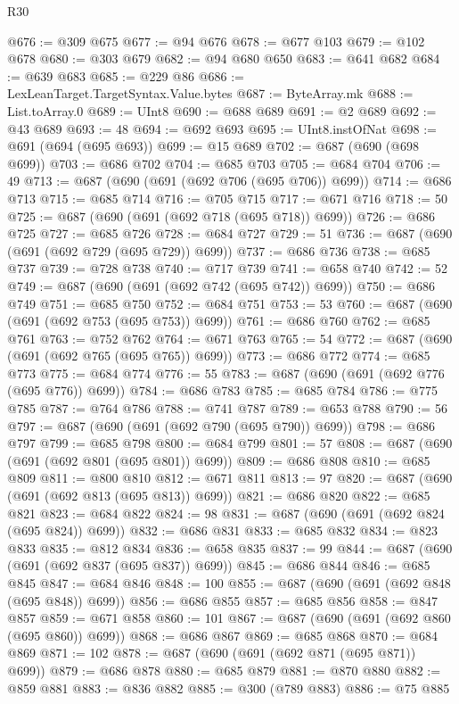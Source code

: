 \begin{lexlean}{R30}
\begin{coremodule}
@676 := @309 @675
@677 := @94 @676
@678 := @677 @103
@679 := @102 @678
@680 := @303 @679
@682 := @94 @680 @650
@683 := @641 @682
@684 := @639 @683
@685 := @229 @86
@686 := LexLeanTarget.TargetSyntax.Value.bytes
@687 := ByteArray.mk
@688 := List.toArray.{0}
@689 := UInt8
@690 := @688 @689
@691 := @2 @689
@692 := @43 @689
@693 := 48
@694 := @692 @693
@695 := UInt8.instOfNat
@698 := @691 (@694 (@695 @693))
@699 := @15 @689
@702 := @687 (@690 (@698 @699))
@703 := @686 @702
@704 := @685 @703
@705 := @684 @704
@706 := 49
@713 := @687 (@690 (@691 (@692 @706 (@695 @706)) @699))
@714 := @686 @713
@715 := @685 @714
@716 := @705 @715
@717 := @671 @716
@718 := 50
@725 := @687 (@690 (@691 (@692 @718 (@695 @718)) @699))
@726 := @686 @725
@727 := @685 @726
@728 := @684 @727
@729 := 51
@736 := @687 (@690 (@691 (@692 @729 (@695 @729)) @699))
@737 := @686 @736
@738 := @685 @737
@739 := @728 @738
@740 := @717 @739
@741 := @658 @740
@742 := 52
@749 := @687 (@690 (@691 (@692 @742 (@695 @742)) @699))
@750 := @686 @749
@751 := @685 @750
@752 := @684 @751
@753 := 53
@760 := @687 (@690 (@691 (@692 @753 (@695 @753)) @699))
@761 := @686 @760
@762 := @685 @761
@763 := @752 @762
@764 := @671 @763
@765 := 54
@772 := @687 (@690 (@691 (@692 @765 (@695 @765)) @699))
@773 := @686 @772
@774 := @685 @773
@775 := @684 @774
@776 := 55
@783 := @687 (@690 (@691 (@692 @776 (@695 @776)) @699))
@784 := @686 @783
@785 := @685 @784
@786 := @775 @785
@787 := @764 @786
@788 := @741 @787
@789 := @653 @788
@790 := 56
@797 := @687 (@690 (@691 (@692 @790 (@695 @790)) @699))
@798 := @686 @797
@799 := @685 @798
@800 := @684 @799
@801 := 57
@808 := @687 (@690 (@691 (@692 @801 (@695 @801)) @699))
@809 := @686 @808
@810 := @685 @809
@811 := @800 @810
@812 := @671 @811
@813 := 97
@820 := @687 (@690 (@691 (@692 @813 (@695 @813)) @699))
@821 := @686 @820
@822 := @685 @821
@823 := @684 @822
@824 := 98
@831 := @687 (@690 (@691 (@692 @824 (@695 @824)) @699))
@832 := @686 @831
@833 := @685 @832
@834 := @823 @833
@835 := @812 @834
@836 := @658 @835
@837 := 99
@844 := @687 (@690 (@691 (@692 @837 (@695 @837)) @699))
@845 := @686 @844
@846 := @685 @845
@847 := @684 @846
@848 := 100
@855 := @687 (@690 (@691 (@692 @848 (@695 @848)) @699))
@856 := @686 @855
@857 := @685 @856
@858 := @847 @857
@859 := @671 @858
@860 := 101
@867 := @687 (@690 (@691 (@692 @860 (@695 @860)) @699))
@868 := @686 @867
@869 := @685 @868
@870 := @684 @869
@871 := 102
@878 := @687 (@690 (@691 (@692 @871 (@695 @871)) @699))
@879 := @686 @878
@880 := @685 @879
@881 := @870 @880
@882 := @859 @881
@883 := @836 @882
@885 := @300 (@789 @883)
@886 := @75 @885

\end{coremodule}
\end{lexlean}
